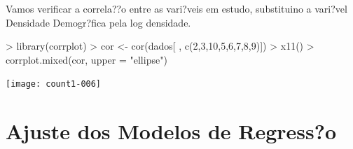 \documentclass[a4paper]{article} %
\begin{document}
Vamos verificar a correla??o entre as vari?veis em estudo, substituino a vari?vel Densidade Demogr?fica pela log densidade.

\begin{Schunk}
\begin{Sinput}
> library(corrplot)
> cor <- cor(dados[ , c(2,3,10,5,6,7,8,9)])
> x11()
> corrplot.mixed(cor, upper = "ellipse")
\end{Sinput}
\end{Schunk}
\texttt{[image: count1-006]}



\section{Ajuste dos Modelos de Regress?o}
\end{document}
